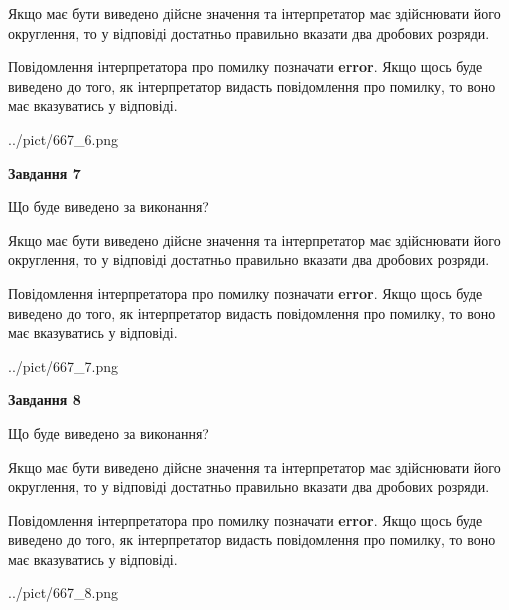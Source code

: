 \documentclass[12pt, ukrainian]{article}
\begin{document}
{\begin {Large}
Якщо має бути виведено дійсне значення та інтерпретатор має здійснювати його округлення, 
то у відповіді достатньо правильно вказати два дробових розряди.

Повідомлення інтерпретатора про помилку позначати \textbf{error}.
Якщо щось буде виведено до того, як інтерпретатор видасть повідомлення про помилку, 
то воно має вказуватись у відповіді. \par

\begin{center}
	{../pict/667_6.png}
\end{center}
\newpage

{\begin {center}\textbf{Завдання 7}\end {center}}\par
Що буде виведено за виконання? \par

Якщо має бути виведено дійсне значення та інтерпретатор має здійснювати його округлення, 
то у відповіді достатньо правильно вказати два дробових розряди.

Повідомлення інтерпретатора про помилку позначати \textbf{error}.
Якщо щось буде виведено до того, як інтерпретатор видасть повідомлення про помилку, 
то воно має вказуватись у відповіді. \par

\begin{center}
	{../pict/667_7.png}
\end{center}
\newpage

{\begin {center}\textbf{Завдання 8}\end {center}}\par
Що буде виведено за виконання? \par

Якщо має бути виведено дійсне значення та інтерпретатор має здійснювати його округлення, 
то у відповіді достатньо правильно вказати два дробових розряди.

Повідомлення інтерпретатора про помилку позначати \textbf{error}.
Якщо щось буде виведено до того, як інтерпретатор видасть повідомлення про помилку, 
то воно має вказуватись у відповіді. \par

\begin{center}
	{../pict/667_8.png}
\end{center}
\newpage


\end{Large}}
\end{document}
